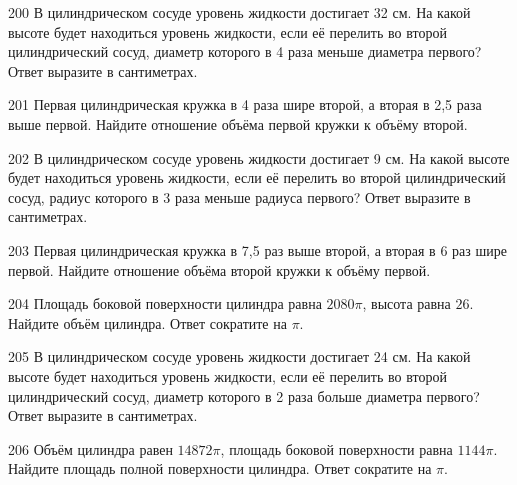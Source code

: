 \documentclass[4apaper]{article}
\begin{document}
\begin{taskBN}{200}
В цилиндрическом сосуде уровень жидкости достигает 32 см. На какой высоте будет находиться уровень жидкости, если её перелить во второй цилиндрический сосуд, диаметр которого в 4 раза меньше диаметра первого? Ответ выразите в сантиметрах.
\end{taskBN}

\begin{taskBN}{201}
 Первая цилиндрическая кружка в 4 раза шире второй, а вторая в 2,5 раза выше первой. Найдите отношение объёма первой кружки к объёму второй.
\end{taskBN}

\begin{taskBN}{202}
В цилиндрическом сосуде уровень жидкости достигает 9 см. На какой высоте будет находиться уровень жидкости, если её перелить во второй цилиндрический сосуд, радиус которого в 3 раза меньше радиуса первого? Ответ выразите в сантиметрах.
\end{taskBN}

\begin{taskBN}{203}
 Первая цилиндрическая кружка в 7,5 раз выше второй, а вторая в 6 раз шире первой. Найдите отношение объёма второй кружки к объёму первой.
\end{taskBN}

\begin{taskBN}{204}
Площадь боковой поверхности цилиндра равна $2080\pi$, высота равна $26$. Найдите объём цилиндра. Ответ сократите на $\pi$.
\end{taskBN}

\begin{taskBN}{205}
В цилиндрическом сосуде уровень жидкости достигает 24 см. На какой высоте будет находиться уровень жидкости, если её перелить во второй цилиндрический сосуд, диаметр которого в 2 раза больше диаметра первого? Ответ выразите в сантиметрах.
\end{taskBN}

\begin{taskBN}{206}
Объём цилиндра равен $14872\pi$, площадь боковой поверхности равна $1144\pi$. Найдите площадь полной поверхности цилиндра. Ответ сократите на $\pi$.
\end{taskBN}
\end{document}
